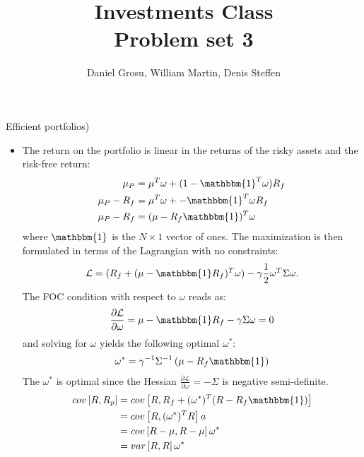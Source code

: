 \documentclass[10pt]{article}
\newcommand{\Lcal}{\mathcal{L}}
\newenvironment{exercise}[2][Exercise]{\begin{trivlist}
  \item[\hskip \labelsep {\bfseries #1}\hskip \labelsep {\bfseries #2.}]}{\end{trivlist}}
\begin{document}
	
  
  \renewcommand{\qedsymbol}{\blacksquare}
	\title{Investments Class \\ Problem set 3}
	\author{Daniel Grosu, William Martin, Denis Steffen}
	
	\maketitle

  \begin{exercise}{1}(Efficient portfolios)
    \begin{itemize}
      \item
    The return on the portfolio is linear in the returns of the risky assets and
    the risk-free return:
    \begin{align*}
      \mu_P &= \mu^T \omega + (1 - \mathbbm{1}^T \omega) R_f \\
      \mu_P - R_f &= \mu^T \omega +  - \mathbbm{1}^T \omega R_f \\
      \mu_P - R_f &= (\mu - R_f\mathbbm{1})^T \omega
    \end{align*}
    where $\mathbbm{1}$ is the $N \times 1$ vector of ones. The maximization is
    then formulated in terms of the Lagrangian with no constraints:
    \begin{align*}
      \Lcal = (R_f + (\mu - \mathbbm{1}R_f)^T \omega) - \gamma \frac 1 2 \omega^T \Sigma \omega.
    \end{align*}
    The FOC condition with respect to $\omega$ reads as:
    \begin{align*}
      \frac{\partial \Lcal}{\partial \omega} = \mu - \mathbbm{1} R_f - \gamma \Sigma \omega = 0
    \end{align*}
    and solving for $\omega$ yields the following optimal $\omega^*$:
    \begin{align*}
      \omega^* = \gamma^{-1}\Sigma^{-1} \left( \mu - R_f \mathbbm{1} \right)
    \end{align*}
    The $\omega^*$ is optimal since the Hessian $\frac{\partial \Lcal}{\partial \omega} =
    -\Sigma$ is negative semi-definite.
      \begin{align*}
        cov \left[R, R_p \right] &= cov \left[ R, R_f + (\omega^*)^T(R - R_f\mathbbm{1}) \right] \\
        &= cov \left[ R, (\omega^*)^T R \right]a \\
        &= cov \left[ R - \mu, R - \mu \right] \omega^* \\
        &= var \left[ R, R \right] \omega^* \\

\end{align*}
\end{itemize}
\end{exercise}
\end{document}
